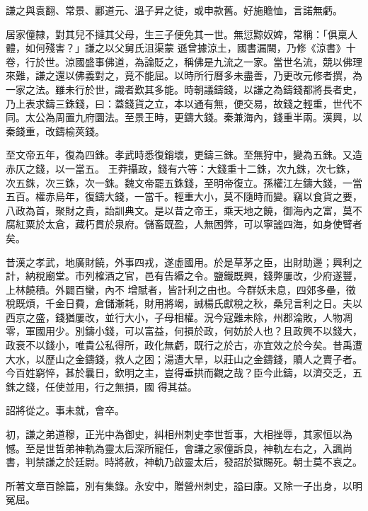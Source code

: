 \begin{pinyinscope}
 謙之與袁翻、常景、酈道元、溫子昇之徒，或申款舊。好施贍恤，言諾無虧。



 居家僮隸，對其兒不撻其父母，生三子便免其一世。無愆黥奴婢，常稱：「俱稟人體，如何殘害？」謙之以父舅氏沮渠蒙
 遜曾據涼土，國書漏闕，乃修《涼書》十卷，行於世。涼國盛事佛道，為論貶之，稱佛是九流之一家。當世名流，競以佛理來難，謙之還以佛義對之，竟不能屈。以時所行曆多未盡善，乃更改元修者撰，為一家之法。雖未行於世，識者歎其多能。時朝議鑄錢，以謙之為鑄錢都將長者史，乃上表求鑄三銖錢，曰：蓋錢貨之立，本以通有無，便交易，故錢之輕重，世代不同。太公為周置九府圜法。至景王時，更鑄大錢。秦兼海內，錢重半兩。漢興，以秦錢重，改鑄榆莢錢。



 至文帝五年，復為四銖。孝武時悉復銷壞，更鑄三銖。至無狩中，變為五銖。又造赤仄之錢，以一當五。
 王莽攝政，錢有六等：大錢重十二銖，次九銖，次七銖，次五銖，次三銖，次一銖。魏文帝罷五銖錢，至明帝復立。孫權江左鑄大錢，一當五百。權赤烏年，復鑄大錢，一當千。輕重大小，莫不隨時而變。竊以食貨之要，八政為首，聚財之貴，詒訓典文。是以昔之帝王，乘天地之饒，御海內之富，莫不腐紅粟於太倉，藏朽貫於泉府。儲畜既盈，人無困弊，可以寧謐四海，如身使臂者矣。



 昔漢之孝武，地廣財饒，外事四戎，遂虛國用。於是草茅之臣，出財助邊；興利之計，納稅廟堂。市列榷酒之官，邑有告緡之令。鹽鐵既興，錢弊屢改，少府遂豐，上林饒積。外闢百蠻，內不
 增賦者，皆計利之由也。今群妖未息，四郊多壘，徵稅既煩，千金日費，倉儲漸耗，財用將竭，誠楊氏獻稅之秋，桑兒言利之日。夫以西京之盛，錢猶屢改，並行大小，子母相權。況今寇難未除，州郡淪敗，人物凋零，軍國用少。別鑄小錢，可以富益，何損於政，何妨於人也？且政興不以錢大，政衰不以錢小，唯貴公私得所，政化無虧，既行之於古，亦宜效之於今矣。昔禹遭大水，以歷山之金鑄錢，救人之困；湯遭大旱，以莊山之金鑄錢，贖人之賣子者。今百姓窮悴，甚於曩日，欽明之主，豈得垂拱而觀之哉？臣今此鑄，以濟交乏，五銖之錢，任使並用，行之無損，國
 得其益。



 詔將從之。事未就，會卒。



 初，謙之弟道穆，正光中為御史，糾相州刺史李世哲事，大相挫辱，其家恒以為憾。至是世哲弟神軌為靈太后深所寵任，會謙之家僮訴良，神軌左右之，入諷尚書，判禁謙之於廷尉。時將赦，神軌乃啟靈太后，發詔於獄賜死。朝士莫不哀之。



 所著文章百餘篇，別有集錄。永安中，贈營州刺史，謚曰康。又除一子出身，以明冤屈。




\end{pinyinscope}
